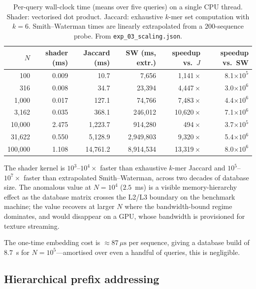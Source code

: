 \documentclass[twocolumn,11pt,a4paper]{article}
\theoremstyle{definition}
\theoremstyle{remark}
\begin{document}
\begin{table}[t]
  \centering\small
  \caption{Per-query wall-clock time (means over five queries) on a single
  CPU thread. Shader: vectorised dot product. Jaccard: exhaustive
  $k$-mer set computation with $k = 6$. Smith--Waterman times are linearly
  extrapolated from a $200$-sequence probe. From
  \texttt{exp\_03\_scaling.json}.}
  \label{tab:scaling}
  \begin{tabular}{r | r r r | r r}
    \toprule
    $N$ & shader (ms) & Jaccard (ms) & SW (ms, extr.) & speedup vs.\ $J$ & speedup vs.\ SW \\
    \midrule
        100 & 0.009   &       10.7 &         7{,}656 &   1{,}141\,$\times$ &   8.1$\times10^{5}$ \\
        316 & 0.008   &       34.7 &       23{,}394 &   4{,}447\,$\times$ &   3.0$\times10^{6}$ \\
      1{,}000 & 0.017   &      127.1 &       74{,}766 &   7{,}483\,$\times$ &   4.4$\times10^{6}$ \\
      3{,}162 & 0.035   &      368.1 &      246{,}012 &  10{,}620\,$\times$ &   7.1$\times10^{6}$ \\
     10{,}000 & 2.475   &    1{,}223.7 &      914{,}280 &        494\,$\times$ &   3.7$\times10^{5}$ \\
     31{,}622 & 0.550   &    5{,}128.9 &    2{,}949{,}803 &   9{,}320\,$\times$ &   5.4$\times10^{6}$ \\
    100{,}000 & 1.108   &   14{,}761.2 &    8{,}914{,}534 &  13{,}319\,$\times$ &   8.0$\times10^{6}$ \\
    \bottomrule
  \end{tabular}
\end{table}

The shader kernel is $10^3$--$10^4\times$ faster than exhaustive $k$-mer
Jaccard and $10^5$--$10^7\times$ faster than extrapolated Smith--Waterman,
across two decades of database size. The anomalous value at $N = 10^4$
($2.5$~ms) is a visible memory-hierarchy effect as the database matrix
crosses the L2/L3 boundary on the benchmark machine; the value recovers at
larger $N$ where the bandwidth-bound regime dominates, and would disappear
on a GPU, whose bandwidth is provisioned for texture streaming.

The one-time embedding cost is $\approx 87\,\mu\mathrm{s}$ per sequence,
giving a database build of $8.7$~s for $N = 10^5$---amortised over even
a handful of queries, this is negligible.

\subsection{Hierarchical prefix addressing}
\label{sec:exp:addr}
\end{document}
